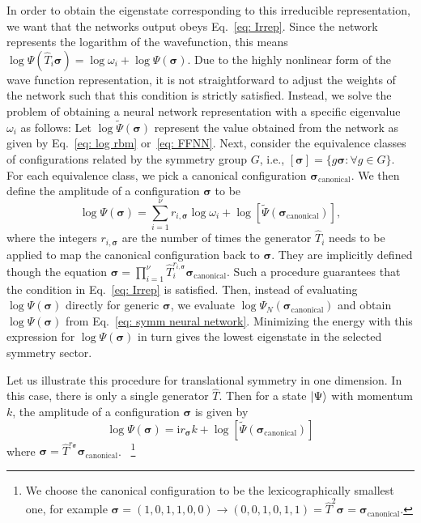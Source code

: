 \documentclass[aps,prl,twocolumn,amsmath,amssymb,superscriptaddress,floatfix]{revtex4-1}
\newcommand{\bs}[1]{\boldsymbol{#1}}
\begin{document}
In order to obtain the eigenstate corresponding to this irreducible representation, we want that the networks output obeys Eq.~\eqref{eq: Irrep}. Since the network represents the logarithm of the wavefunction, this means $\log{\Psi(\hat{T}_{i}\boldsymbol{\sigma})} = \log\omega_{i} + \log{\Psi(\boldsymbol{\sigma})} $. Due to the highly nonlinear form of the wave function representation, it is not straightforward to adjust the weights of the network such that this condition is strictly satisfied. 
Instead, we solve the problem of obtaining a neural network representation with a specific eigenvalue $\omega_i$ as follows: Let $ \log{\tilde{\Psi}(\boldsymbol{\sigma})}$ represent the value obtained from the network as given by Eq.~\eqref{eq: log rbm} or~\eqref{eq: FFNN}. Next, consider the equivalence classes of configurations related by the symmetry group $G$, i.e., $[\boldsymbol{\sigma}] = \lbrace g\boldsymbol{\sigma} : \forall g \in G\rbrace$. For each equivalence class, we pick a canonical configuration $\boldsymbol{\sigma}_{\mathrm{canonical}}$. We then define the amplitude of a configuration $\boldsymbol{\sigma}$ to be
\begin{equation}
\log{\Psi(\boldsymbol{\sigma})} = \sum_{i=1}^\nu {r_{i,\bs{\sigma}}} \log\omega_{i} + \log\left[\tilde{\Psi}(\boldsymbol{\sigma}_{\mathrm{canonical}})\right],
\label{eq: symm neural network}
\end{equation}
where the integers $r_{i,\bs{\sigma}}$ are the number of times the generator $\hat{T}_i$ needs to be applied to map the canonical configuration back to $\bs{\sigma}$. They are implicitly defined though the equation $ \boldsymbol{\sigma} = \prod_{i=1}^\nu  \hat{T}_{i}^{r_{i,\bs{\sigma}}} \boldsymbol{\sigma}_{\mathrm{canonical}}$.
Such a procedure guarantees that the condition in Eq.~\eqref{eq: Irrep} is satisfied. Then, instead of evaluating $\log{\Psi(\boldsymbol{\sigma})}$ directly for generic $\bs{\sigma}$, we evaluate $\log{\Psi_{N}}(\boldsymbol{\sigma}_{\mathrm{canonical}})$ and obtain $\log{\Psi(\boldsymbol{\sigma})}$ from Eq.~\eqref{eq: symm neural network}. Minimizing the energy with this expression for $\log{\Psi(\boldsymbol{\sigma})}$ in turn gives the lowest eigenstate in the selected symmetry sector.

Let us illustrate this procedure for translational symmetry in one dimension. In this case, there is only a single generator $\hat{T}$. Then for a state $\ket{\Psi}$ with momentum $k$, the amplitude of a configuration $\boldsymbol{\sigma}$ is given by 
\begin{equation}
\log{\Psi(\boldsymbol{\sigma})}  = \mathrm{i}r_{\bs{\sigma}}k +  \log\left[\tilde{\Psi}(\boldsymbol{\sigma}_{\mathrm{canonical}})\right]
\end{equation}
where $\boldsymbol{\sigma} = \hat{T}^{r_{\bs{\sigma}}} \boldsymbol{\sigma}_{\mathrm{canonical}}$. 
~\footnote{We choose the canonical configuration to be the lexicographically smallest one, for example
$
\boldsymbol{\sigma}  = (1,0,1,1,0,0) \rightarrow (0,0,1,0,1,1) = \hat{T}^{2} \boldsymbol{\sigma} = \boldsymbol{\sigma}_{\mathrm{canonical}}
$.
}
\end{document}
